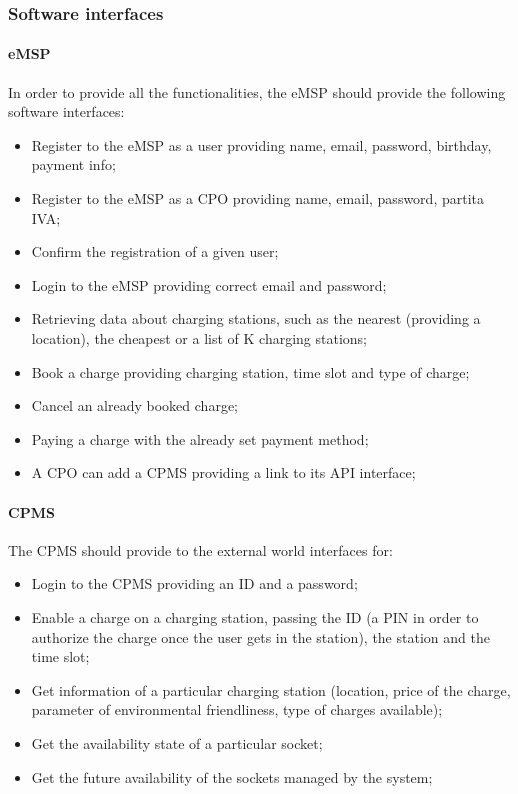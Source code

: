 \subsubsection{Software interfaces}
\paragraph{\ac{eMSP}}
In order to provide all the functionalities, the \ac{eMSP} should provide the following software interfaces:
\begin{itemize}
    \item Register to the \ac{eMSP} as a user providing name, email, password, birthday, payment info;
    \item Register to the \ac{eMSP} as a \ac{CPO} providing name, email, password, \gls{partita IVA};
    \item Confirm the registration of a given user;
    \item Login to the \ac{eMSP} providing correct email and password;
    \item Retrieving data about charging stations, such as the nearest (providing a location), the cheapest or a list of K charging stations;
    \item Book a charge providing charging station, time slot and type of charge;
    \item Cancel an already booked charge;
    \item Paying a charge with the already set payment method;
    \item A \ac{CPO} can add a \ac{CPMS} providing a link to its \ac{API} interface;
\end{itemize}

\paragraph{\ac{CPMS}}
The \ac{CPMS} should provide to the external world interfaces for:
\begin{itemize}
    \item Login to the \ac{CPMS} providing an ID and a password;
    \item Enable a charge on a charging station, passing the ID (a PIN in order to authorize the charge once the user gets in the station), the station and the time slot;
    \item Get information of a particular charging station (location, price of the charge, parameter of environmental friendliness, type of charges available);
    \item Get the availability state of a particular socket;
    \item Get the future availability of the sockets managed by the system;
\end{itemize}

